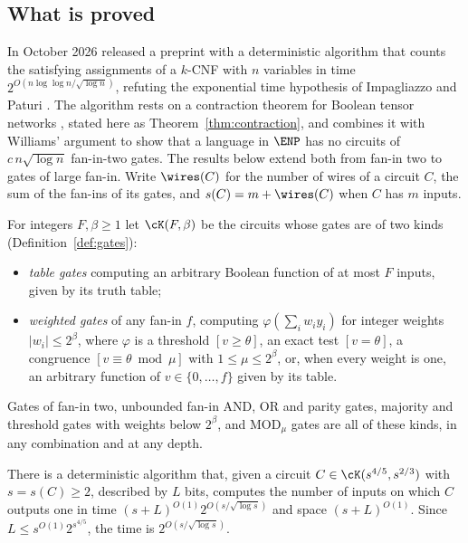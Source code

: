 \subsection{What is proved}
In October 2026 \oai{} released a preprint \cite{OAI26} with a deterministic
algorithm that counts the satisfying assignments of a $k$-CNF with $n$ variables
in time $2^{O(n\log\log n/\sqrt{\log n})}$, refuting the exponential time
hypothesis of Impagliazzo and Paturi \cite{IP01}. The algorithm rests on a
contraction theorem for Boolean tensor networks \cite[Theorem D.1]{OAI26},
stated here as Theorem~\ref{thm:contraction}, and \cite[Corollary 1.4]{OAI26}
combines it with Williams' argument \cite{Wil13} to show that a language in
$\ENP$ has no circuits of $c\,n\sqrt{\log n}$ fan-in-two gates. The results
below extend both from fan-in two to gates of large fan-in. Write $\wires(C)$
for the number of wires of a circuit $C$, the sum of the fan-ins of its gates,
and $s(C)=m+\wires(C)$ when $C$ has $m$ inputs.

For integers $F,\beta\ge 1$ let $\cK(F,\beta)$ be the circuits whose gates are of
two kinds (Definition~\ref{def:gates}):
\begin{itemize}[leftmargin=2em]
\item \emph{table gates} computing an arbitrary Boolean function of at most $F$
inputs, given by its truth table;
\item \emph{weighted gates} of any fan-in $f$, computing $\varphi(\sum_i
w_iy_i)$ for integer weights $|w_i|\le 2^{\beta}$, where $\varphi$ is a
threshold $[v\ge\theta]$, an exact test $[v=\theta]$, a congruence
$[v\equiv\theta\bmod\mu]$ with $1\le\mu\le2^\beta$, or, when every weight is
one, an arbitrary function of $v\in\{0,\dots,f\}$ given by its table.
\end{itemize}
Gates of fan-in two, unbounded fan-in AND, OR and parity gates, majority and
threshold gates with weights below $2^\beta$, and $\mathrm{MOD}_\mu$ gates are
all of these kinds, in any combination and at any depth.

\begin{theoremA}
There is a deterministic algorithm that, given a circuit $C\in\cK(s^{4/5},s^{2/3})$
with $s=s(C)\ge 2$, described by $L$ bits, computes the number of inputs on which
$C$ outputs one in time $(s+L)^{O(1)}2^{O(s/\sqrt{\log s})}$ and space
$(s+L)^{O(1)}$. Since $L\le s^{O(1)}2^{s^{4/5}}$, the time is
$2^{O(s/\sqrt{\log s})}$.
\end{theoremA}

